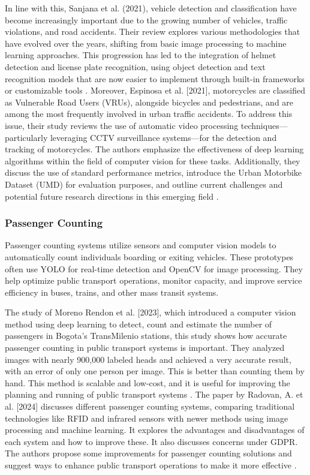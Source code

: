 \begin{refsection}
In line with this, Sanjana et al. (2021), vehicle detection and classification have become increasingly important due to the growing number of vehicles, traffic violations, and road accidents. Their review explores various methodologies that have evolved over the years, shifting from basic image processing to machine learning approaches. This progression has led to the integration of helmet detection and license plate recognition, using object detection and text recognition models that are now easier to implement through built-in frameworks or customizable tools \cite{Sanjana2021}.
Moreover,  Espinosa et al. [2021], motorcycles are classified as Vulnerable Road Users (VRUs), alongside bicycles and pedestrians, and are among the most frequently involved in urban traffic accidents. To address this issue, their study reviews the use of automatic video processing techniques—particularly leveraging CCTV surveillance systems—for the detection and tracking of motorcycles. The authors emphasize the effectiveness of deep learning algorithms within the field of computer vision for these tasks. Additionally, they discuss the use of standard performance metrics, introduce the Urban Motorbike Dataset (UMD) for evaluation purposes, and outline current challenges and potential future research directions in this emerging field \cite{Espinosa2021}.

\subsubsection{Passenger Counting}
 Passenger counting systems utilize sensors and computer vision models to automatically count individuals boarding or exiting vehicles. These prototypes often use YOLO for real-time detection and OpenCV for image processing. They help optimize public transport operations, monitor capacity, and improve service efficiency in buses, trains, and other mass transit systems.

The study of Moreno Rendon et al. [2023], which introduced a computer vision method using deep learning to detect, count and estimate the number of passengers in Bogota's TransMilenio stations, this study shows how accurate passenger counting in public transport systems is important. They analyzed images with nearly 900,000 labeled heads and achieved a very accurate result, with an error of only one person per image. This is better than counting them by hand. This method is scalable and low-cost, and it is useful for improving the planning and running of public transport systems \cite{rendon2023passenger}. The paper by Radovan, A. et al. [2024] discusses different passenger counting systems, comparing traditional technologies like RFID and infrared sensors with newer methods using image processing and machine learning. It explores the advantages and disadvantages of each system and how to improve these. It also discusses concerns under GDPR. The authors propose some improvements for passenger counting solutions and suggest ways to enhance public transport operations to make it more effective \cite{radovan2024passenger}.



\end{refsection}
